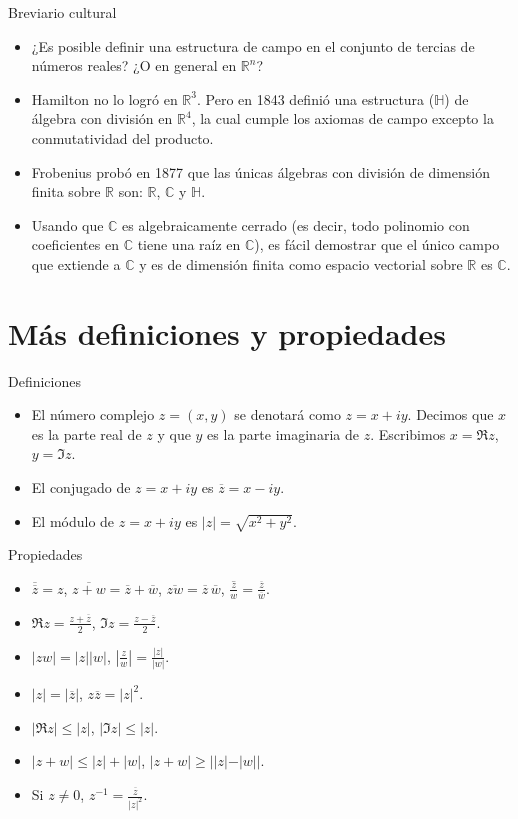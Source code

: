 \documentclass[spanish,presentation]{beamer}
\begin{document}
\begin{frame}[label=sec-3-4]{Breviario cultural}
\begin{itemize}
\item ¿Es posible definir una estructura de campo en el conjunto de
tercias de números reales? ¿O en general en \(\mathbb{R}^{n}\)?
\item Hamilton no lo logró en \(\mathbb{R}^{3}\). Pero en 1843 definió
una estructura (\(\mathbb{H}\)) de \alert{álgebra con división} en
\(\mathbb{R}^{4}\), la cual cumple los axiomas de campo excepto
la conmutatividad del producto.
\item Frobenius probó en 1877 que las únicas álgebras con división de
dimensión finita sobre \(\mathbb{R}\) son: \(\mathbb{R}\),
\(\mathbb{C}\) y \(\mathbb{H}\).
\item Usando que \(\mathbb{C}\) es \alert{algebraicamente cerrado} (es decir,
todo polinomio con coeficientes en \(\mathbb{C}\) tiene una raíz
en \(\mathbb{C}\)), es fácil demostrar que el único campo que
extiende a \(\mathbb{C}\) y es de dimensión finita como espacio
vectorial sobre \(\mathbb{R}\) es \(\mathbb{C}\).
\end{itemize}
\end{frame}
\section{Más definiciones y propiedades}
\label{sec-4}

\begin{frame}[label=sec-4-1]{Definiciones}
\begin{itemize}
\item El número complejo \(z=(x,y)\) se denotará como \(z=x+iy\). Decimos
que \(x\) es la \alert{parte real} de \(z\) y que \(y\) es la \alert{parte
imaginaria} de \(z\). Escribimos \(x=\Re z\), \(y=\Im z\).
\item El \alert{conjugado} de \(z=x+iy\) es \(\overline{z}=x-iy\).
\item El \alert{módulo} de \(z=x+iy\) es \(|z|=\sqrt{x^{2}+y^{2}}\).
\end{itemize}
\end{frame}

\begin{frame}[label=sec-4-2]{Propiedades}
\begin{itemize}
\item \(\overline{\overline{z}}=z\),
\(\overline{z+w}=\overline{z}+\overline{w}\),
\(\overline{zw}=\overline{z}\,\overline{w}\),
\(\overline{\frac{z}{w}}=\frac{\overline{z}}{\overline{w}}\).
\item \(\Re z =\frac{z+\overline{z}}{2}\), \(\Im z =\frac{z-\overline{z}}{2}\).
\item \(|zw|=|z||w|\), \(|\frac{z}{w}|=\frac{|z|}{|w|}\).
\item \(|z|=|\overline{z}|\), \(z\overline{z}=|z|^{2}\).
\item \(|\Re z|\leq |z|\), \(|\Im z|\leq |z|\).
\item \(|z+w|\leq |z|+|w|\), \(|z+w|\geq ||z|-|w||\).
\item Si \(z\ne 0\), \(z^{-1}=\frac{\overline{z}}{|z|^{2}}\).
\end{itemize}
\end{frame}
\end{document}
